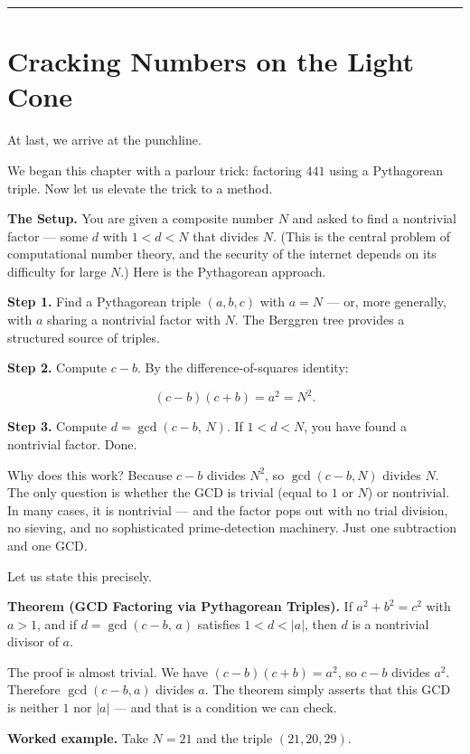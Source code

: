 \documentclass[11pt,openany]{book}
\theoremstyle{definition}
\theoremstyle{plain}
\theoremstyle{remark}
\begin{document}
\bigskip\noindent\rule{\textwidth}{0.4pt}\bigskip


\section*{Cracking Numbers on the Light Cone}


At last, we arrive at the punchline.

We began this chapter with a parlour trick: factoring $441$ using a Pythagorean triple. Now let us elevate the trick to a method.

\textbf{The Setup.} You are given a composite number $N$ and asked to find a nontrivial factor — some $d$ with $1 < d < N$ that divides $N$. (This is the central problem of computational number theory, and the security of the internet depends on its difficulty for large $N$.) Here is the Pythagorean approach.

\textbf{Step 1.} Find a Pythagorean triple $(a, b, c)$ with $a = N$ — or, more generally, with $a$ sharing a nontrivial factor with $N$. The Berggren tree provides a structured source of triples.

\textbf{Step 2.} Compute $c - b$. By the difference-of-squares identity:

$$(c - b)(c + b) = a^2 = N^2.$$

\textbf{Step 3.} Compute $d = \gcd(c - b, \, N)$. If $1 < d < N$, you have found a nontrivial factor. Done.

Why does this work? Because $c - b$ divides $N^2$, so $\gcd(c - b, N)$ divides $N$. The only question is whether the GCD is trivial (equal to $1$ or $N$) or nontrivial. In many cases, it is nontrivial — and the factor pops out with no trial division, no sieving, and no sophisticated prime-detection machinery. Just one subtraction and one GCD.

Let us state this precisely.

\textbf{Theorem (GCD Factoring via Pythagorean Triples).} If $a^2 + b^2 = c^2$ with $a > 1$, and if $d = \gcd(c - b, \, a)$ satisfies $1 < d < |a|$, then $d$ is a nontrivial divisor of $a$.

The proof is almost trivial. We have $(c - b)(c + b) = a^2$, so $c - b$ divides $a^2$. Therefore $\gcd(c - b, a)$ divides $a$. The theorem simply asserts that this GCD is neither $1$ nor $|a|$ — and that is a condition we can check.

\textbf{Worked example.} Take $N = 21$ and the triple $(21, 20, 29)$.
\end{document}
